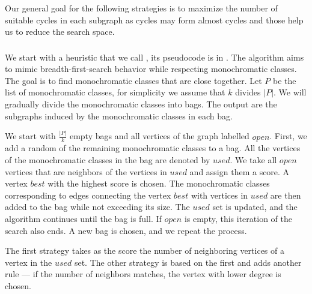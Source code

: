 Our general goal for the following strategies
is to maximize the number of suitable cycles in each
subgraph as cycles may form almost cycles and those help us
to reduce the search space.

\subsubsection{\Neighbors{}}

We start with a heuristic that we call \Neighbors{},
its pseudocode is in .
The algorithm aims to mimic breadth-first-search
behavior while respecting monochromatic classes.
The goal is to find monochromatic classes that are close together.
Let $P$ be the list of monochromatic classes,
for simplicity we assume that $k$ divides $|P|$.
We will gradually divide the monochromatic classes into bags.
The output are the subgraphs induced by the monochromatic classes in each bag.

We start with $\frac{|P|}{k}$ empty bags
and all vertices of the graph labelled $open$.
First, we add a random of the remaining monochromatic classes to a bag.
All the vertices of the monochromatic classes in the bag are denoted by $used$.
We take all $open$ vertices that are neighbors of the vertices in $used$ and assign
them a score. A vertex $best$ with the highest score is chosen.
The monochromatic classes corresponding to edges connecting the vertex $best$
with vertices in $used$ are then added to the bag while not exceeding its size.
The $used$ set is updated, and the algorithm continues until the bag is full.
If $open$ is empty, this iteration of the search also ends.
A new bag is chosen, and we repeat the process.

The first strategy \Neighbors{} takes as the score the number of
neighboring vertices of a vertex in the $used$ set.
The other strategy \NeighborsDegree{} is based
on the first and adds another rule ---
if the number of neighbors matches, the vertex with lower degree is chosen.

